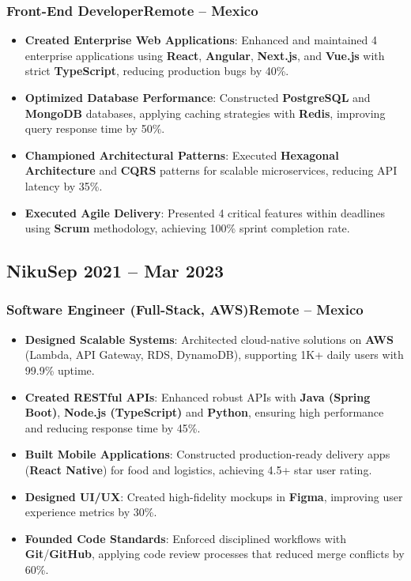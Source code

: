 \documentclass[a4paper,10pt]{article}
\newcommand{\kw}[1]{\textbf{\textcolor{keyword}{#1}}}
\newcommand{\tech}[1]{\textbf{\textcolor{tech}{#1}}}
\begin{document}
\subsubsection*{\small Front-End Developer\hfill Remote -- Mexico}
\begin{itemize}[noitemsep, leftmargin=*]
    \item \textbf{Created Enterprise Web Applications}: Enhanced and maintained 4 enterprise applications using \tech{React}, \tech{Angular}, \tech{Next.js}, and \tech{Vue.js} with strict \tech{TypeScript}, reducing production bugs by 40\%.
    \item \textbf{Optimized Database Performance}: Constructed \kw{PostgreSQL} and \kw{MongoDB} databases, applying caching strategies with \tech{Redis}, improving query response time by 50\%.
    \item \textbf{Championed Architectural Patterns}: Executed \kw{Hexagonal Architecture} and \kw{CQRS} patterns for scalable microservices, reducing API latency by 35\%.
    \item \textbf{Executed Agile Delivery}: Presented 4 critical features within deadlines using \kw{Scrum} methodology, achieving 100\% sprint completion rate.
\end{itemize}

\subsection*{\small Niku\hfill\textbf{Sep 2021 -- Mar 2023}}
\subsubsection*{\small Software Engineer (Full-Stack, AWS)\hfill Remote -- Mexico}
\begin{itemize}[noitemsep, leftmargin=*]
    \item \textbf{Designed Scalable Systems}: Architected cloud-native solutions on \tech{AWS} (Lambda, API Gateway, RDS, DynamoDB), supporting 1K+ daily users with 99.9\% uptime.
    \item \textbf{Created RESTful APIs}: Enhanced robust APIs with \tech{Java (Spring Boot)}, \tech{Node.js (TypeScript)} and \tech{Python}, ensuring high performance and reducing response time by 45\%.
    \item \textbf{Built Mobile Applications}: Constructed production-ready delivery apps (\tech{React Native}) for food and logistics, achieving 4.5+ star user rating.
    \item \textbf{Designed UI/UX}: Created high-fidelity mockups in \tech{Figma}, improving user experience metrics by 30\%.
    \item \textbf{Founded Code Standards}: Enforced disciplined workflows with \tech{Git}/\tech{GitHub}, applying code review processes that reduced merge conflicts by 60\%.
\end{itemize}
\end{document}

